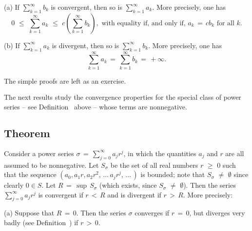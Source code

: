 \V

        (a) If $\sum_{k=1}^{{\infty}} b_{k}$ is convergent, then so is $\sum_{k=1}^{{\infty}} a_{k}$.
    More precisely, one has
        \begin{displaymath}
        0\,\,{\leq}\,\,\sum_{k=1}^{{\infty}} a_{k}\,\,{\leq}\,\,c\left(\sum_{k=1}^{{\infty}} b_{k}\right), \mbox{ with equality if, and only if, $a_{k} \,=\, cb_{k}$ for all $k$}.
        \end{displaymath}

\V

        (b) If $\sum_{k=1}^{{\infty}} a_{k}$ is divergent, then so is $\sum_{k=1}^{{\infty}} b_{k}$.
    More precisely, one has
        \begin{displaymath}
        \sum_{k=1}^{{\infty}} a_{k} \,=\, \sum_{k=1}^{{\infty}} b_{k} \,=\, +{\infty}.
        \end{displaymath}

\V

        The simple proofs are left as an exercise.

\V
\V

    The next results study the convergence properties for the special class of power series -- see Definition~  above --  whose terms are nonnegative.

\V

        \subsection{\small{{\bf Theorem}}}
        \label{ThmG50.20}

\V

        Consider a power series ${\sigma} \,=\, \sum_{j=0}^{{\infty}} a_{j}r^{j}$,
    in which the quantities $a_{j}$ and $r$ are all assumed to be nonnegative.
    Let $S_{{\sigma}}$ be the set of all real numbers $r\,\,{\geq}\,\,0$ such that the sequence $(a_{0}, a_{1}r, a_{2}r^{2}, \,{\ldots}\,a_{j}r^{j},\,{\ldots}\,)$ is bounded;
    note that $S_{{\sigma}} \,\,{\neq}\,\, {\emptyset}$ since clearly $0{\in}S$.
    Let $R \,=\, {\sup}\,S_{{\sigma}}$ (which exists, since $S_{{\sigma}} \,\,{\neq}\,\, {\emptyset}$).
    Then the series $\sum_{j=0}^{{\infty}} a_{j}r^{j}$ is convergent if $r\,<\,R$ and is divergent if $r\,>\,R$.
    More precisely:

\V

        (a) Suppose that $R \,=\, 0$.
    Then the series ${\sigma}$ converges if $r \,=\, 0$, but diverges very badly (see Definition~) if $r\,>\,0$.


